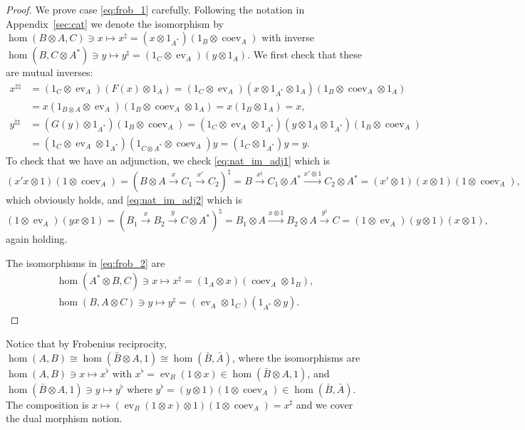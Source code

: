 \documentclass[a4paper,11pt]{article}
\theoremstyle{plain}
\theoremstyle{remark}
\newcommand{\ev}{\operatorname{ev}}
\newcommand{\coev}{\operatorname{coev}}
\newcommand{\conj}[1]{\bar{#1}}
\begin{document}
\begin{proof}
We prove case \eqref{eq:frob_1} carefully.  Following the notation in Appendix~\ref{sec:cat} we denote the isomorphism by
$\hom(B\otimes A, C) \ni x \mapsto x^\natural = (x\otimes 1_{A^*})(1_B\otimes\coev_A)$ with inverse $\hom(B,C\otimes A^*) \ni y\mapsto y^\natural = (1_C\otimes\ev_A)(y\otimes 1_A)$.  We first check that these are mutual inverses:
\begin{align*}
x^{\natural\natural} &= (1_C\otimes\ev_A)(F(x)\otimes 1_A)
= (1_C\otimes\ev_A)(x\otimes 1_{A^*}\otimes 1_A) (1_B\otimes\coev_A\otimes 1_A) \\
&= x (1_{B\otimes A}\otimes\ev_A) (1_B\otimes\coev_A\otimes 1_A) = x(1_B\otimes 1_A) = x, \\
y^{\natural\natural} &= (G(y)\otimes 1_{A^*})(1_B\otimes\coev_A)
= (1_C\otimes\ev_A\otimes 1_{A^*})(y\otimes 1_A\otimes 1_{A^*})(1_B\otimes\coev_A) \\
&= (1_C\otimes\ev_A\otimes 1_{A^*})(1_{C\otimes A^*}\otimes \coev_A) y
= (1_C\otimes 1_{A^*}) y = y.
\end{align*}
To check that we have an adjunction, we check \eqref{eq:nat_im_adj1} which is
\[  (x'x\otimes 1)(1\otimes\coev_A) =
(B\otimes A \xrightarrow{x} C_1 \xrightarrow{x'} C_2)^\natural
= B \xrightarrow{x^\natural} C_1\otimes A^* \xrightarrow{x'\otimes 1} C_2\otimes A^*
= (x'\otimes 1) (x\otimes 1)(1\otimes\coev_A), \]
which obviously holds, and \eqref{eq:nat_im_adj2} which is
\[ (1\otimes\ev_A)(yx\otimes 1)
= (B_1 \xrightarrow{x} B_2 \xrightarrow{y} C \otimes A^*)^\natural
= B_1\otimes A \xrightarrow{x\otimes 1} B_2\otimes A \xrightarrow{y^\natural} C
= (1\otimes\ev_A)(y\otimes 1)(x\otimes 1), \]
again holding.

The isomorphisms in \eqref{eq:frob_2} are
\begin{gather*}
  \hom(A^*\otimes B, C) \ni x \mapsto x^\natural = (1_A\otimes x)(\coev_A\otimes 1_B), \\
  \hom(B, A\otimes C) \ni y \mapsto y^\natural = (\ev_A\otimes 1_C)(1_{A^*}\otimes y).
\end{gather*}
\end{proof}

Notice that by Frobenius reciprocity, $\hom(A, B) \cong \hom(\conj B \otimes A,1) \cong \hom(\conj B, \conj A)$, where the isomorphisms are $\hom(A,B) \ni x \mapsto x^\flat$ with $x^\flat = \ev_B(1\otimes x) \in \hom(\conj B \otimes A,1)$, and $\hom(\conj B\otimes A,1) \ni y \mapsto y^\flat$ where $y^\flat = (y\otimes 1)(1\otimes\coev_A) \in \hom(\conj B, \conj A)$.  The composition is $x \mapsto (\ev_B(1\otimes x)\otimes 1)(1\otimes\coev_A) = x^\sharp$ and we cover the dual morphism notion.
\end{document}

